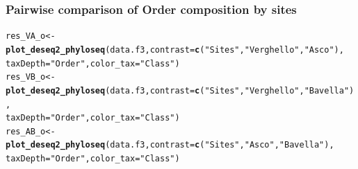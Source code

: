 \documentclass[12pt]{article}\usepackage[]{graphicx}\usepackage[]{color}
\makeatletter
\newcommand{\hlstr}[1]{\textcolor[rgb]{0.192,0.494,0.8}{#1}}%
\newcommand{\hlstd}[1]{\textcolor[rgb]{0.345,0.345,0.345}{#1}}%
\newcommand{\hlkwb}[1]{\textcolor[rgb]{0.69,0.353,0.396}{#1}}%
\newcommand{\hlkwc}[1]{\textcolor[rgb]{0.333,0.667,0.333}{#1}}%
\newcommand{\hlkwd}[1]{\textcolor[rgb]{0.737,0.353,0.396}{\textbf{#1}}}%
\newenvironment{kframe}{%
 \def\at@end@of@kframe{}%
 \ifinner\ifhmode%
  \def\at@end@of@kframe{\end{minipage}}%
  \begin{minipage}{\columnwidth}%
 \fi\fi%
 \def\FrameCommand##1{\hskip\@totalleftmargin \hskip-\fboxsep
 \colorbox{shadecolor}{##1}\hskip-\fboxsep
     \hskip-\linewidth \hskip-\@totalleftmargin \hskip\columnwidth}%
 \MakeFramed {\advance\hsize-\width
   \@totalleftmargin\z@ \linewidth\hsize
   \@setminipage}}%
 {\par\unskip\endMakeFramed%
 \at@end@of@kframe}
\newenvironment{knitrout}{}{} %
\numberwithin{figure}{section}
\makeatother
\begin{document}
    \subsubsection{Pairwise comparison of Order composition by sites}

\begin{knitrout}\small
{}\color{fgcolor}\begin{kframe}
\begin{alltt}
\hlstd{res_VA_o} \hlkwb{<-} \hlkwd{plot_deseq2_phyloseq}\hlstd{(data.f3,} \hlkwc{contrast} \hlstd{=} \hlkwd{c}\hlstd{(}\hlstr{"Sites"}\hlstd{,} \hlstr{"Verghello"}\hlstd{,} \hlstr{"Asco"}\hlstd{),}
                               \hlkwc{taxDepth} \hlstd{=} \hlstr{"Order"}\hlstd{,} \hlkwc{color_tax} \hlstd{=} \hlstr{"Class"}\hlstd{)}
\hlstd{res_VB_o} \hlkwb{<-} \hlkwd{plot_deseq2_phyloseq}\hlstd{(data.f3,} \hlkwc{contrast} \hlstd{=} \hlkwd{c}\hlstd{(}\hlstr{"Sites"}\hlstd{,} \hlstr{"Verghello"}\hlstd{,} \hlstr{"Bavella"}\hlstd{),}
                               \hlkwc{taxDepth} \hlstd{=} \hlstr{"Order"}\hlstd{,} \hlkwc{color_tax} \hlstd{=} \hlstr{"Class"}\hlstd{)}
\hlstd{res_AB_o} \hlkwb{<-} \hlkwd{plot_deseq2_phyloseq}\hlstd{(data.f3,} \hlkwc{contrast} \hlstd{=} \hlkwd{c}\hlstd{(}\hlstr{"Sites"}\hlstd{,} \hlstr{"Asco"}\hlstd{,} \hlstr{"Bavella"}\hlstd{),}
                               \hlkwc{taxDepth} \hlstd{=} \hlstr{"Order"}\hlstd{,} \hlkwc{color_tax} \hlstd{=} \hlstr{"Class"}\hlstd{)}
\end{alltt}
\end{kframe}
\end{knitrout}
\end{document}
